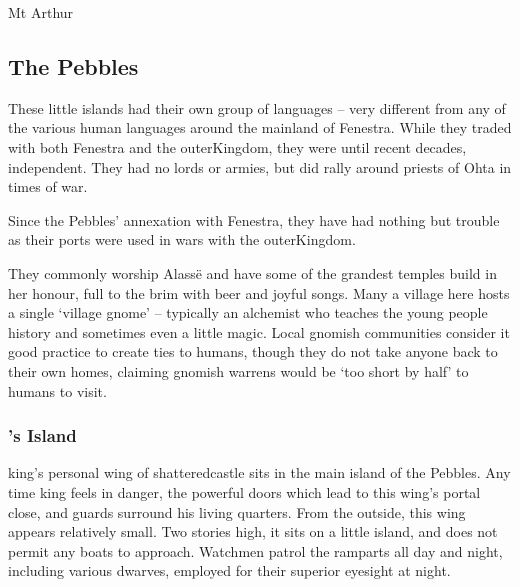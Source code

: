 \begin{multicols}{2}
{\begin{encounters}{Mt Arthur}
\end{encounters}
}

\subsection{The Pebbles}


These little islands had their own group of languages -- very different from any of the various human languages around the mainland of Fenestra.  While they traded with both Fenestra and the \gls{outerKingdom}, they were until recent decades, independent.
They had no lords or armies, but did rally around priests of Ohta in times of war.

Since the Pebbles' annexation with Fenestra, they have had nothing but trouble as their ports were used in wars with the \gls{outerKingdom}.

They commonly worship Alass\"{e} and have some of the grandest temples build in her honour, full to the brim with beer and joyful songs.
Many a village here hosts a single `village gnome' -- typically an alchemist who teaches the young people history and sometimes even a little magic.
Local gnomish communities consider it good practice to create ties to humans, though they do not take anyone back to their own homes, claiming gnomish warrens would be `too short by half' to humans to visit.

\subsubsection{'s Island}

\Gls{king}'s personal wing of \gls{shatteredcastle} sits in the main island of the Pebbles.
Any time \gls{king} feels in danger, the powerful doors which lead to this wing's portal close, and guards surround his living quarters.
From the outside, this wing appears relatively small.
Two stories high, it sits on a little island, and does not permit any boats to approach.
Watchmen patrol the ramparts all day and night, including various dwarves, employed for their superior eyesight at night.

\iftoggle{players}{}{
\subsubsection{Seasonal Encounters}

\paragraph{Cold} weather can freeze portions of the sea over, creating temporary bridges to nearby islands and grounding boats.
The inhabitants of the Pebbles are adept at preparing for such times, and have about a hundred well-known recipes for salted and smoked fish.
}
\end{multicols}
